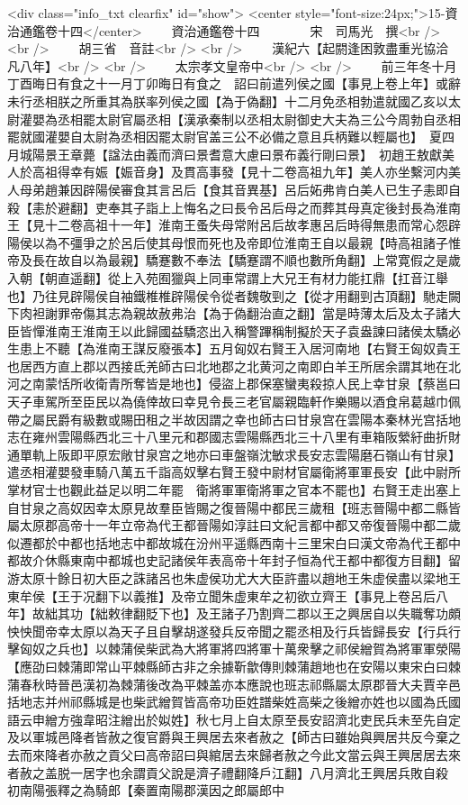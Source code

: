 <div class="info_txt clearfix" id="show">
<center style="font-size:24px;">15-資治通鑑卷十四</center>
  　　資治通鑑卷十四　　　　宋　司馬光　撰<br />
<br />
　　胡三省　音註<br />
<br />
　　漢紀六【起閼逢困敦盡重光協洽凡八年】<br />
<br />
　　太宗孝文皇帝中<br />
<br />
　　前三年冬十月丁酉晦日有食之十一月丁卯晦日有食之　詔曰前遣列侯之國【事見上卷上年】或辭未行丞相朕之所重其為朕率列侯之國【為于偽翻】十二月免丞相勃遣就國乙亥以太尉灌嬰為丞相罷太尉官屬丞相【漢承秦制以丞相太尉御史大夫為三公今周勃自丞相罷就國灌嬰自太尉為丞相因罷太尉官盖三公不必備之意且兵柄難以輕屬也】　夏四月城陽景王章薨【諡法由義而濟曰景耆意大慮曰景布義行剛曰景】　初趙王敖獻美人於高祖得幸有娠【娠音身】及貫高事發【見十二卷高祖九年】美人亦坐繫河内美人母弟趙兼因辟陽侯審食其言呂后【食其音異基】呂后妬弗肯白美人已生子恚即自殺【恚於避翻】吏奉其子詣上上悔名之曰長令呂后母之而葬其母真定後封長為淮南王【見十二卷高祖十一年】淮南王蚤失母常附呂后故孝惠呂后時得無患而常心怨辟陽侯以為不彊爭之於呂后使其母恨而死也及帝即位淮南王自以最親【時高祖諸子惟帝及長在故自以為最親】驕蹇數不奉法【驕蹇謂不順也數所角翻】上常寛假之是歲入朝【朝直遥翻】從上入苑囿獵與上同車常謂上大兄王有材力能扛鼎【扛音江舉也】乃往見辟陽侯自袖鐵椎椎辟陽侯令從者魏敬剄之【從才用翻剄古頂翻】馳走闕下肉袒謝罪帝傷其志為親故赦弗治【為于偽翻治直之翻】當是時薄太后及太子諸大臣皆憚淮南王淮南王以此歸國益驕恣出入稱警蹕稱制擬於天子袁盎諫曰諸侯太驕必生患上不聽【為淮南王謀反廢張本】五月匈奴右賢王入居河南地【右賢王匈奴貴王也居西方直上郡以西接氐羌師古曰北地郡之北黄河之南即白羊王所居余謂其地在北河之南蒙恬所收衛青所奪皆是地也】侵盜上郡保塞蠻夷殺掠人民上幸甘泉【蔡邕曰天子車駕所至臣民以為僥倖故曰幸見令長三老官屬親臨軒作樂賜以酒食帛葛越巾佩帶之屬民爵有級數或賜田租之半故因謂之幸也師古曰甘泉宫在雲陽本秦林光宫括地志在雍州雲陽縣西北三十八里元和郡國志雲陽縣西北三十八里有車箱阪縈紆曲折財通單軌上阪即平原宏敞甘泉宫之地亦曰車盤嶺沈敏求長安志雲陽磨石嶺山有甘泉】遣丞相灌嬰發車騎八萬五千詣高奴擊右賢王發中尉材官屬衛將軍軍長安【此中尉所掌材官士也觀此益足以明二年罷　衛將軍軍衛將軍之官本不罷也】右賢王走出塞上自甘泉之高奴因幸太原見故羣臣皆賜之復晉陽中都民三歲租【班志晉陽中都二縣皆屬太原郡高帝十一年立帝為代王都晉陽如淳註曰文紀言都中都又帝復晉陽中都二歲似遷都於中都也括地志中都故城在汾州平遥縣西南十三里宋白曰漢文帝為代王都中都故介休縣東南中都城也史記諸侯年表高帝十年封子恒為代王都中都復方目翻】留游太原十餘日初大臣之誅諸呂也朱虚侯功尤大大臣許盡以趙地王朱虚侯盡以梁地王東牟侯【王于况翻下以義推】及帝立聞朱虚東牟之初欲立齊王【事見上卷呂后八年】故絀其功【絀敕律翻貶下也】及王諸子乃割齊二郡以王之興居自以失職奪功頗怏怏聞帝幸太原以為天子且自擊胡遂發兵反帝聞之罷丞相及行兵皆歸長安【行兵行擊匈奴之兵也】以棘蒲侯柴武為大將軍將四將軍十萬衆擊之祁侯繒賀為將軍軍滎陽【應劭曰棘蒲即常山平棘縣師古非之余據靳歙傳則棘蒲趙地也在安陽以東宋白曰棘蒲春秋時晉邑漢初為棘蒲後改為平棘盖亦本應說也班志祁縣屬太原郡晉大夫賈辛邑括地志并州祁縣城是也柴武繒賀皆高帝功臣姓譜柴姓高柴之後繒亦姓也以國為氏國語云申繒方強韋昭注繒出於姒姓】秋七月上自太原至長安詔濟北吏民兵未至先自定及以軍城邑降者皆赦之復官爵與王興居去來者赦之【師古曰雖始與興居共反今棄之去而來降者亦赦之貢父曰高帝詔曰與綰居去來歸者赦之今此文當云與王興居居去來者赦之盖脱一居字也余謂貢父說是濟子禮翻降戶江翻】八月濟北王興居兵敗自殺　初南陽張釋之為騎郎【秦置南陽郡漢因之郎屬郎中